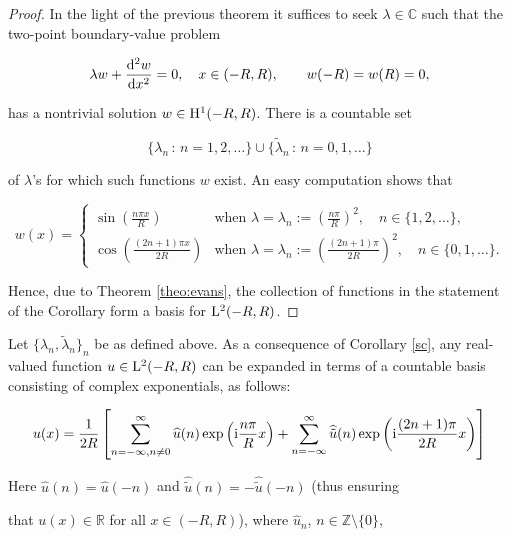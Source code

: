 \documentclass{amsart}
\numberwithin{Theorem}{section}
\numberwithin{equation}{section}
\theoremstyle{definition}
\theoremstyle{remark}
\begin{document}
\begin{proof}

In the light of the previous theorem it suffices to seek $\lambda \in \mathbb{C}$ such that the two-point boundary-value problem

 \[\lambda w +\frac{{\rm d}^2 w}{{\rm d}x^2}  = 0, \quad x \in (-R,R),\qquad w(-R)=w(R)=0,\]

has a nontrivial solution $w \in {{\rm H}}^1(-R,R)$. There is a countable set 

\[\{\lambda_n\,:\,n=1,2,\dots\}\cup\{\tilde{\lambda}_n\,:\,n=0,1,\dots\}\]

of $\lambda$'s for which such functions $w$ exist. An easy computation shows that

\[ w(x) = \left\{\begin{array}{ll} \sin\left(\frac{n\pi x}{R}\right) & \mbox{when $\lambda=\lambda_n := \left(\frac{n\pi }{R}\right)^2$},\quad n\in\{1,2,\dots\},\\

\cos\left(\frac{(2n+1)\pi x}{2R}\right) & \mbox{when $\lambda =\lambda_n := \left(\frac{(2n+1)\pi}{2R} \right)^2$},\quad n\in \{0,1,\dots\}.
\end{array}
\right.
\]

Hence, due to  Theorem \ref{theo:evans},  the collection of functions in the statement of the Corollary form a basis for ${{\rm L}}^2(-R,R)$.

\end{proof}

\bigskip

Let $\{\lambda_n , \tilde{\lambda}_n\}_n$  be as defined above. As a consequence of Corollary \ref{sc},
any real-valued function $u \in {{\rm L}}^2(-R,R)$
can be expanded in terms of a countable basis consisting of complex exponentials, as follows:

\begin{equation} \label{eq: sol}
u(x) = \frac{1}{2R}\left[\sum_{n=-\infty, n\neq 0}^{\infty}\widehat{u}(n) \exp \left({\rm i}\frac{n\pi}{R}x\right)   + \sum_{n=-\infty}^{\infty}
\widehat{\tilde{u}} (n) \exp\left( {\rm i} \frac{(2n+1)\pi}{2R} x\right)\right]
\end{equation}

Here $\widehat{u}(n) = \widehat{u}(-n)$ and  $\widehat{\tilde{u}}(n) = -\widehat{\tilde{u}}(-n)$ (thus ensuring

that $u(x) \in \mathbb{R}$ for all $x \in (-R,R)$), where $\widehat{u}_n$, $n \in \mathbb{Z}\setminus \{0\}$,
\end{document}
